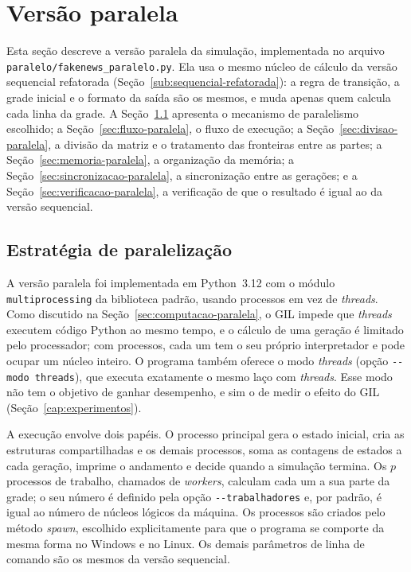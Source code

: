 
\chapter{Versão paralela}\label{cap:paralela}

Esta seção descreve a versão paralela da simulação, implementada no arquivo \texttt{paralelo/fakenews\_paralelo.py}. Ela usa o mesmo núcleo de cálculo da versão sequencial refatorada (Seção~\ref{sub:sequencial-refatorada}): a regra de transição, a grade inicial e o formato da saída são os mesmos, e muda apenas quem calcula cada linha da grade. A Seção~\ref{sec:estrategia-paralela} apresenta o mecanismo de paralelismo escolhido; a Seção~\ref{sec:fluxo-paralela}, o fluxo de execução; a Seção~\ref{sec:divisao-paralela}, a divisão da matriz e o tratamento das fronteiras entre as partes; a Seção~\ref{sec:memoria-paralela}, a organização da memória; a Seção~\ref{sec:sincronizacao-paralela}, a sincronização entre as gerações; e a Seção~\ref{sec:verificacao-paralela}, a verificação de que o resultado é igual ao da versão sequencial.

\section{Estratégia de paralelização}\label{sec:estrategia-paralela}

A versão paralela foi implementada em Python~3.12 com o módulo \texttt{multiprocessing} da biblioteca padrão, usando processos em vez de \textit{threads}. Como discutido na Seção~\ref{sec:computacao-paralela}, o \ac{GIL} impede que \textit{threads} executem código Python ao mesmo tempo, e o cálculo de uma geração é limitado pelo processador; com processos, cada um tem o seu próprio interpretador e pode ocupar um núcleo inteiro. O programa também oferece o modo \textit{threads} (opção \texttt{-{}-modo threads}), que executa exatamente o mesmo laço com \textit{threads}. Esse modo não tem o objetivo de ganhar desempenho, e sim o de medir o efeito do \ac{GIL} (Seção~\ref{cap:experimentos}).

A execução envolve dois papéis. O processo principal gera o estado inicial, cria as estruturas compartilhadas e os demais processos, soma as contagens de estados a cada geração, imprime o andamento e decide quando a simulação termina. Os $p$ processos de trabalho, chamados de \textit{workers}, calculam cada um a sua parte da grade; o seu número é definido pela opção \texttt{-{}-trabalhadores} e, por padrão, é igual ao número de núcleos lógicos da máquina. Os processos são criados pelo método \textit{spawn}, escolhido explicitamente para que o programa se comporte da mesma forma no Windows e no Linux. Os demais parâmetros de linha de comando são os mesmos da versão sequencial.


